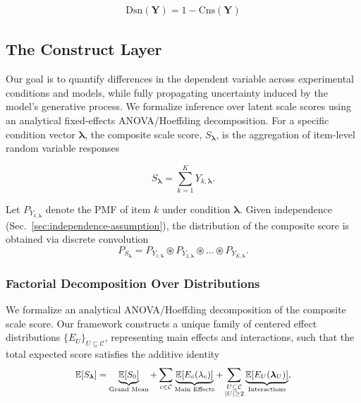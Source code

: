 \begin{equation}    
\label{eq:dissension}
\begin{aligned}
\mathrm{Dsn}(\mathbf{Y}) = 1 - \mathrm{Cns}(\mathbf{Y})
\end{aligned}
\end{equation}


\subsection{The Construct Layer}
\label{app:construct}

Our goal is to quantify differences in the dependent variable across
experimental conditions and models, while fully propagating
uncertainty induced by the model's generative process. 
We formalize inference over latent scale scores
using an analytical fixed-effects ANOVA/Hoeffding decomposition.
For a specific condition vector $\boldsymbol{\lambda}$, 
the composite scale score, $S_{\boldsymbol{\lambda}}$, 
is the aggregation of item-level random variable responses

\begin{equation}
\label{eq:s-lambda}
S_{\boldsymbol{\lambda}}
=
\sum_{k=1}^K Y_{k,\boldsymbol{\lambda}}.
\end{equation}

Let $P_{Y_{k, \boldsymbol{\lambda}}}$ denote the PMF of item $k$ under condition $\boldsymbol{\lambda}$. Given independence (Sec.~\ref{sec:independence-assumption}), the distribution of the composite score is obtained via discrete convolution
\begin{equation}
\label{eq:item-wise-convolution}
    P_{S_{\boldsymbol{\lambda}}} = P_{Y_{1, \boldsymbol{\lambda}}} \circledast P_{Y_{2, \boldsymbol{\lambda}}} \circledast \dots \circledast P_{Y_{K, \boldsymbol{\lambda}}}.
\end{equation}
 

\subsubsection{Factorial Decomposition Over Distributions}

We formalize an analytical ANOVA/Hoeffding decomposition of the composite scale score. 
Our framework constructs a unique family of centered effect distributions $\{E_U\}_{U \subseteq \mathcal{C}}$, representing main effects and interactions, such that the total expected score satisfies the additive identity
\begin{equation}
\label{eq:decomposition-preview}
\small
\mathbb{E}[S_{\boldsymbol{\lambda}}] = \underbrace{\mathbb{E}[S_0]}_{\text{Grand Mean}} + \sum_{c \in \mathcal{C}} \underbrace{\mathbb{E}[E_c(\lambda_c)]}_{\text{Main Effects}} + \sum_{\substack{U \subseteq \mathcal{C} \\ |U| \ge 2}} \underbrace{\mathbb{E}[E_U(\boldsymbol{\lambda}_U)]}_{\text{Interactions}},
\end{equation}


